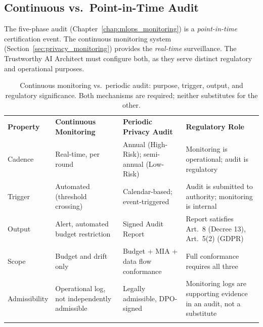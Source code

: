 \subsection{Continuous vs.\ Point-in-Time Audit}
\label{subsec:audit_cadence}

The five-phase audit (Chapter~\ref{chap:mlops_monitoring}) is a \emph{point-in-time} certification event. The continuous monitoring system (Section~\ref{sec:privacy_monitoring}) provides the \emph{real-time} surveillance. The Trustworthy AI Architect must configure both, as they serve distinct regulatory and operational purposes.

\begin{table}[ht]
\centering
\caption{Continuous monitoring vs.\ periodic audit: purpose, trigger, output, and regulatory significance. Both mechanisms are required; neither substitutes for the other.}
\label{tab:audit_vs_monitoring}
\renewcommand{\arraystretch}{1.3}
\begin{tabular}{p{2.8cm} p{3.4cm} p{3.4cm} p{3.0cm}}
\hline\noalign{\smallskip}
\textbf{Property} & \textbf{Continuous Monitoring} & \textbf{Periodic Privacy Audit} & \textbf{Regulatory Role} \\
\noalign{\smallskip}\svhline\noalign{\smallskip}
Cadence & Real-time, per round & Annual (High-Risk); semi-annual (Low-Risk) & Monitoring is operational; audit is regulatory \\[4pt]
Trigger & Automated (threshold crossing) & Calendar-based; event-triggered & Audit is submitted to authority; monitoring is internal \\[4pt]
Output & Alert, automated budget restriction & Signed Audit Report & Report satisfies Art.~8 (Decree 13), Art.~5(2) (GDPR) \\[4pt]
Scope & Budget and drift only & Budget + MIA + data flow conformance & Full conformance requires all three \\[4pt]
Admissibility & Operational log, not independently admissible & Legally admissible, DPO-signed & Monitoring logs are supporting evidence in an audit, not a substitute \\
\noalign{\smallskip}\hline\noalign{\smallskip}
\end{tabular}
\end{table}

